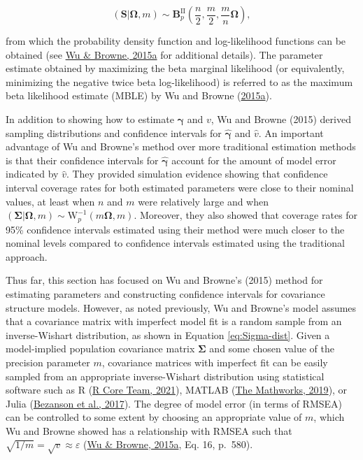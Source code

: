 \documentclass[11pt]{umnthesis}
\begin{document}
\begin{equation}
(\mathbf{S} | \bm{\Omega}, m) \sim \mathbf{B}^{\textrm{II}}_{p}\left(\frac{n}{2}, \frac{m}{2}, \frac{m}{n}\bm{\Omega} \right),
\label{eq:matrix-variate-beta}
\end{equation}

\noindent from which the probability density function and log-likelihood functions can be obtained (see \protect\hyperlink{ref-wu2015}{Wu \& Browne, 2015a} for additional details). The parameter estimate obtained by maximizing the beta marginal likelihood (or equivalently, minimizing the negative twice beta log-likelihood) is referred to as the maximum beta likelihood estimate (MBLE) by Wu and Browne (\protect\hyperlink{ref-wu2015}{2015a}).

In addition to showing how to estimate \(\bm{\gamma}\) and \(v\), Wu and Browne (2015) derived sampling distributions and confidence intervals for \(\hat{\bm{\gamma}}\) and \(\hat{v}\). An important advantage of Wu and Browne's method over more traditional estimation methods is that their confidence intervals for \(\hat{\bm{\gamma}}\) account for the amount of model error indicated by \(\hat{v}\). They provided simulation evidence showing that confidence interval coverage rates for both estimated parameters were close to their nominal values, at least when \(n\) and \(m\) were relatively large and when \((\bm{\Sigma} | \bm{\Omega}, m) \sim \textrm{W}^{-1}_p (m \bm{\Omega}, m)\). Moreover, they also showed that coverage rates for 95\% confidence intervals estimated using their method were much closer to the nominal levels compared to confidence intervals estimated using the traditional approach.

Thus far, this section has focused on Wu and Browne's (2015) method for estimating parameters and constructing confidence intervals for covariance structure models. However, as noted previously, Wu and Browne's model assumes that a covariance matrix with imperfect model fit is a random sample from an inverse-Wishart distribution, as shown in Equation \eqref{eq:Sigma-dist}. Given a model-implied population covariance matrix \(\bm{\Sigma}\) and some chosen value of the precision parameter \(m\), covariance matrices with imperfect fit can be easily sampled from an appropriate inverse-Wishart distribution using statistical software such as R (\protect\hyperlink{ref-R-base}{R Core Team, 2021}), MATLAB (\protect\hyperlink{ref-matlab}{The Mathworks, 2019}), or Julia (\protect\hyperlink{ref-bezanson2017julia}{Bezanson et al., 2017}). The degree of model error (in terms of RMSEA) can be controlled to some extent by choosing an appropriate value of \(m\), which Wu and Browne showed has a relationship with RMSEA such that \(\sqrt{1/m} = \sqrt{v} \approx \varepsilon\) (\protect\hyperlink{ref-wu2015}{Wu \& Browne, 2015a}, Eq. 16, p.~580).
\end{document}
